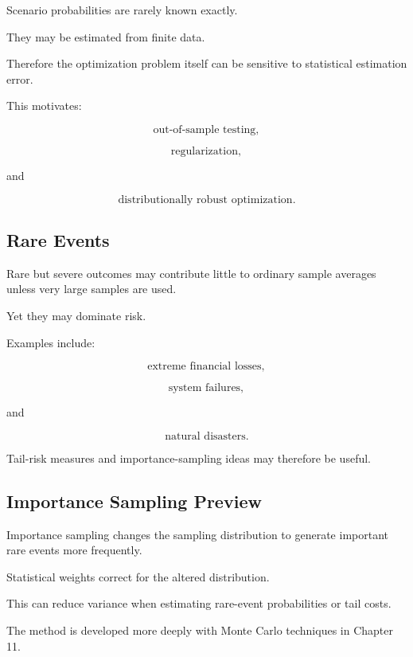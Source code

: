 Scenario probabilities are rarely known exactly.

They may be estimated from finite data.

Therefore the optimization problem itself can be sensitive to statistical
estimation error.

This motivates:

\[
\boxed{
\text{out-of-sample testing},
}
\]

\[
\boxed{
\text{regularization},
}
\]

and

\[
\boxed{
\text{distributionally robust optimization}.
}
\]

\subsection{Rare Events}
\label{subsec:rare-events-stochastic-optimization}

Rare but severe outcomes may contribute little to ordinary sample averages
unless very large samples are used.

Yet they may dominate risk.

Examples include:

\[
\boxed{
\text{extreme financial losses},
}
\]

\[
\boxed{
\text{system failures},
}
\]

and

\[
\boxed{
\text{natural disasters}.
}
\]

Tail-risk measures and importance-sampling ideas may therefore be useful.

\subsection{Importance Sampling Preview}
\label{subsec:importance-sampling-stochastic-optimization}

Importance sampling changes the sampling distribution to generate
important rare events more frequently.

Statistical weights correct for the altered distribution.

This can reduce variance when estimating rare-event probabilities or tail
costs.

The method is developed more deeply with Monte Carlo techniques in
Chapter 11.

